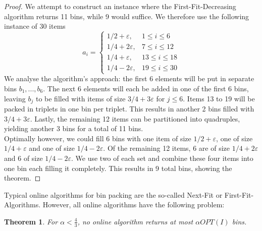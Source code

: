 \documentclass[a4paper, 12pt]{article}
\newtheorem{theorem}{Theorem}[section]
\begin{document}
	\begin{proof}
		We attempt to construct an instance where the First-Fit-Decreasing algorithm returns 11 bins, while 9 would suffice. We therefore use the following instance of 30 items \[a_i = \begin{cases}
			1/2 + \varepsilon, & 1 \leq i \leq 6\\
			1/4 + 2\varepsilon, & 7 \leq i \leq 12\\
			1/4 + \varepsilon, & 13 \leq i \leq 18\\
			1/4 - 2\varepsilon, & 19 \leq i \leq 30
		\end{cases}\]
		We analyse the algorithm's approach: the first 6 elements will be put in separate bins $b_1,...,b_6$. The next 6 elements will each be added in one of the first 6 bins, leaving $b_j$ to be filled with items of size $3/4 + 3 \varepsilon$ for $j \leq 6$. Items 13 to 19 will be packed in triplets in one bin per triplet. This results in another 2 bins filled with $3/4 + 3 \varepsilon$. Lastly, the remaining 12 items can be partitioned into quadruples, yielding another 3 bins for a total of 11 bins.\\
		Optimally however, we could fill 6 bins with one item of size $1/2 + \varepsilon$, one of size $1/4 + \varepsilon$ and one of size $1/4 - 2\varepsilon$. Of the remaining 12 items, 6 are of size $1/4+2\varepsilon$ and 6 of size $1/4 - 2\varepsilon$. We use two of each set and combine these four items into one bin each filling it completely. This results in 9 total bins, showing the theorem.
	\end{proof}
	Typical online algorithms for bin packing are the so-called Next-Fit or First-Fit-Algorithms. However, all online algorithms have the following problem: \begin{theorem}
		For $\alpha < \frac{4}{3}$, no online algorithm returns at most $\alpha OPT(I)$ bins.
	\end{theorem}
\end{document}
